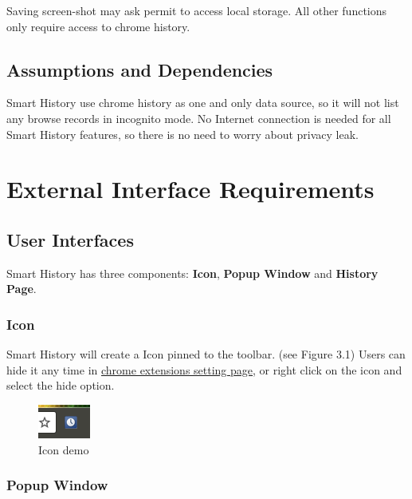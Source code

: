 \documentclass[a5paper]{scrreprt}
\begin{document}
Saving screen-shot may ask permit to access local storage. All other functions 
only require access to chrome history.

\section{Assumptions and Dependencies}

Smart History use chrome history as one and only data source, so it will not
list any browse records in incognito mode. No Internet connection is needed 
for all Smart History features, so there is no need to worry about privacy leak.


\chapter{External Interface Requirements}

\section{User Interfaces}

Smart History has three components: \textbf{Icon}, \textbf{Popup Window} and 
\textbf{History Page}.

\subsection{Icon}

Smart History will create a Icon pinned to the toolbar. (see Figure 3.1) Users 
can hide it any time in \href{chrome://extensions}{chrome extensions setting page}, 
or right click on the icon and select the hide option.

\begin{figure}[h]
	\centering
	\vspace{10pt}
	\includegraphics{spec_icon}
	\vspace{-10pt}
	\caption{Icon demo}
\end{figure}

\subsection{Popup Window}
\end{document}
